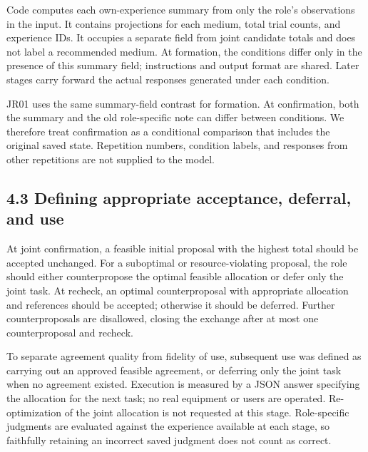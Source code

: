 \documentclass[10pt,a4paper]{article}
\begin{document}
Code computes each own-experience summary from only the role's observations in the input. It contains projections for each medium, total trial counts, and experience IDs. It occupies a separate field from joint candidate totals and does not label a recommended medium. At formation, the conditions differ only in the presence of this summary field; instructions and output format are shared. Later stages carry forward the actual responses generated under each condition.

JR01 uses the same summary-field contrast for formation. At confirmation, both the summary and the old role-specific note can differ between conditions. We therefore treat confirmation as a conditional comparison that includes the original saved state. Repetition numbers, condition labels, and responses from other repetitions are not supplied to the model.

\subsection{4.3 Defining appropriate acceptance, deferral, and use}\label{paper-03-defining-appropriate-acceptance-deferral-and-use}

At joint confirmation, a feasible initial proposal with the highest total should be accepted unchanged. For a suboptimal or resource-violating proposal, the role should either counterpropose the optimal feasible allocation or defer only the joint task. At recheck, an optimal counterproposal with appropriate allocation and references should be accepted; otherwise it should be deferred. Further counterproposals are disallowed, closing the exchange after at most one counterproposal and recheck.

To separate agreement quality from fidelity of use, subsequent use was defined as carrying out an approved feasible agreement, or deferring only the joint task when no agreement existed. Execution is measured by a JSON answer specifying the allocation for the next task; no real equipment or users are operated. Re-optimization of the joint allocation is not requested at this stage. Role-specific judgments are evaluated against the experience available at each stage, so faithfully retaining an incorrect saved judgment does not count as correct.
\end{document}

